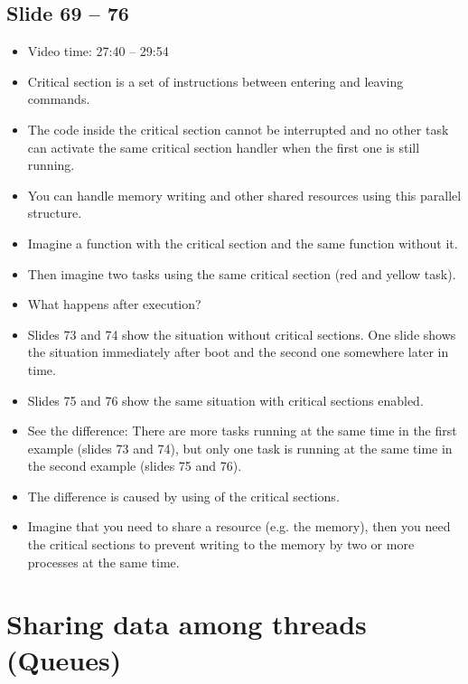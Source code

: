\documentclass[12pt, a4paper]{article}
\begin{document}
	\subsection{Slide 69 -- 76}
	\begin{itemize}
		\item Video time: 27:40 -- 29:54
		\item Critical section is a set of instructions between entering and leaving commands.
		\item The code inside the critical section cannot be interrupted and no other task can activate the same critical section handler when the first one is still running.
		\item You can handle memory writing and other shared resources using this parallel structure.
		\item Imagine a function with the critical section and the same function without it.
		\item Then imagine two tasks using the same critical section (red and yellow task).
		\item What happens after execution?
		\item Slides 73 and 74 show the situation without critical sections. One slide shows the situation immediately after boot and the second one somewhere later in time.
		\item Slides 75 and 76 show the same situation with critical sections enabled.
		\item See the difference: There are more tasks running at the same time in the first example (slides 73 and 74), but only one task is running at the same time in the second example (slides 75 and 76).
		\item The difference is caused by using of the critical sections.
		\item Imagine that you need to share a resource (e.g. the memory), then you need the critical sections to prevent writing to the memory by two or more processes at the same time.
	\end{itemize}

	\section{Sharing data among threads (Queues)}
\end{document}
